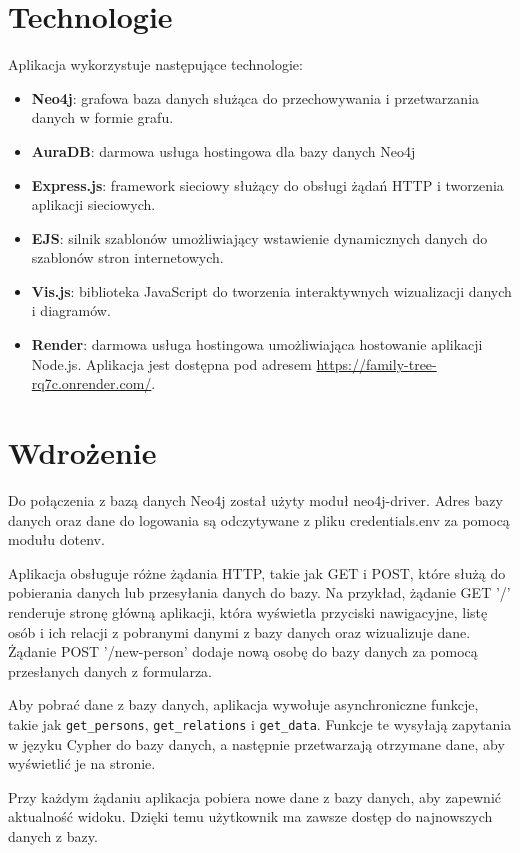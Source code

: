 \documentclass[a4paper]{article}
\begin{document}
\section{Technologie}

Aplikacja wykorzystuje następujące technologie:
\begin{itemize}
\item \textbf{Neo4j}: grafowa baza danych służąca do przechowywania i przetwarzania danych w formie grafu.
\item \textbf{AuraDB}: darmowa usługa hostingowa dla bazy danych Neo4j
\item \textbf{Express.js}: framework sieciowy służący do obsługi żądań HTTP i tworzenia aplikacji sieciowych.
\item \textbf{EJS}: silnik szablonów umożliwiający wstawienie dynamicznych danych do szablonów stron internetowych.
\item \textbf{Vis.js}: biblioteka JavaScript do tworzenia interaktywnych wizualizacji danych i diagramów.
\item \textbf{Render}: darmowa usługa hostingowa umożliwiająca hostowanie aplikacji Node.js. Aplikacja jest dostępna pod adresem \href{https://family-tree-rq7c.onrender.com/}{https://family-tree-rq7c.onrender.com/}.
\end{itemize}

\section{Wdrożenie}
Do połączenia z bazą danych Neo4j został użyty moduł neo4j-driver. 
Adres bazy danych oraz dane do logowania są odczytywane z pliku credentials.env 
za pomocą modułu dotenv.

Aplikacja obsługuje różne żądania HTTP, takie jak GET i POST, które służą do 
pobierania danych lub przesyłania danych do bazy. Na przykład, żądanie GET '/' 
renderuje stronę główną aplikacji, która wyświetla przyciski nawigacyjne, 
listę osób i ich relacji z pobranymi danymi z bazy danych oraz wizualizuje dane. 
Żądanie POST '/new-person' dodaje nową osobę do bazy danych za pomocą przesłanych 
danych z formularza.

Aby pobrać dane z bazy danych, aplikacja wywołuje asynchroniczne funkcje, takie 
jak \texttt{get\_persons}, \texttt{get\_relations} i \texttt{get\_data}. 
Funkcje te wysyłają zapytania w języku Cypher do bazy danych, a następnie 
przetwarzają otrzymane dane, aby wyświetlić je na stronie.

Przy każdym żądaniu aplikacja pobiera nowe dane z bazy danych, aby zapewnić 
aktualność widoku. Dzięki temu użytkownik ma zawsze dostęp do najnowszych 
danych z bazy.
\end{document}
